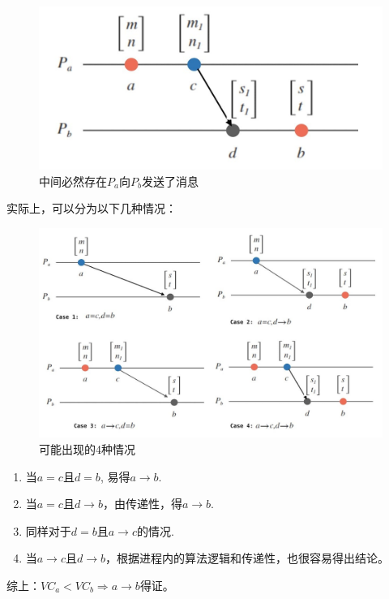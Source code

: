 \documentclass[cn,11pt,chinese]{elegantbook}
\providecommand{\tightlist}{%
  \setlength{\itemsep}{0pt}\setlength{\parskip}{0pt}}
\begin{document}
\begin{figure}
\centering
\includegraphics{images/appendix-a-14.jpeg}
\caption{中间必然存在\(P_a\)向\(P_b\)发送了消息}
\end{figure}

实际上，可以分为以下几种情况：

\begin{figure}
\centering
\includegraphics{images/appendix-a-15.jpeg}
\caption{可能出现的4种情况}
\end{figure}

\begin{enumerate}
\def\labelenumi{\arabic{enumi}.}
\tightlist
\item
  当\(a = c\)且\(d = b\), 易得\(a \rightarrow b\).
\item
  当\(a = c\)且\(d \rightarrow b\)，由传递性，得\(a \rightarrow b\).
\item
  同样对于\(d = b\)且\(a \rightarrow c\)的情况.
\item
  当\(a \rightarrow c\)且\(d \rightarrow b\)，根据进程内的算法逻辑和传递性，也很容易得出结论。
\end{enumerate}

综上：\(VC_a < VC_b \Rightarrow a \rightarrow b\)得证。
\end{document}

